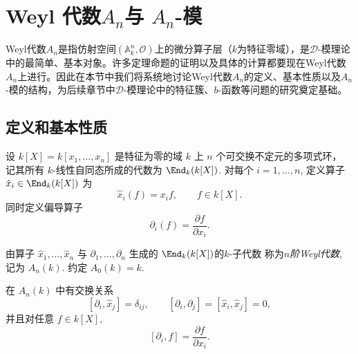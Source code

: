 \section{Weyl 代数$A_n$与 $A_n$-模}
Weyl代数$A_n$是指仿射空间$\left(\mathbb{A}^n_k,\mathcal{O}\right)$上的微分算子层（$k$为特征零域），是$\mathcal{D}$-模理论中的最简单、基本对象。许多定理命题的证明以及具体的计算都要现在Weyl代数$A_n$上进行。因此在本节中我们将系统地讨论Weyl代数$A_n$的定义、基本性质以及$A_n$-模的结构，为后续章节中$\mathcal{D}$-模理论中的特征簇、$b$-函数等问题的研究奠定基础。


\subsection{定义和基本性质}
设 $k[X]=k[x_1,\dots,x_n]$ 是特征为零的域 $k$ 上
$n$ 个可交换不定元的多项式环，
记其所有 $k$-线性自同态所成的代数为 $\End_k(k[X])$.
对每个 $i=1,\dots,n$,
定义算子 $\hat{x}_i\in \End_k(k[X])$ 为
\[
    \hat{x}_i(f)=x_i f, \qquad f\in k[X].
\]
同时定义偏导算子
\[
    \partial_i(f)=\frac{\partial f}{\partial x_i}.
\]
\begin{definition}
    由算子 $\hat{x}_1,\dots,\hat{x}_n$ 与
    $\partial_1,\dots,\partial_n$
    生成的 $\End_k(k[X])$的$k$-子代数
    称为\emph{$n$阶Weyl代数},
    记为 $A_n(k)$.
    约定 $A_0(k)=k$.
\end{definition}



\begin{proposition}
    在 $A_n(k)$ 中有交换关系
    \[
        [\partial_i,\hat{x}_j]=\delta_{ij}, \qquad
    [\partial_i,\partial_j]=[\hat{x}_i,\hat{x}_j]=0,
    \]
    并且对任意 $f\in k[X]$,
    \[
        [\partial_i,f]=\frac{\partial f}{\partial x_i}.
    \]
\end{proposition}

